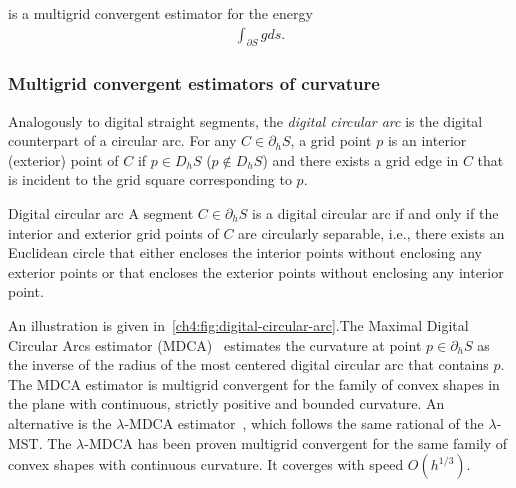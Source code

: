 is a multigrid convergent estimator for the energy~\cite{lachaud06hdr}
\begin{align*}
	\int_{\partial S}{ g ds }.
\end{align*}



\subsubsection{Multigrid convergent estimators of curvature}

Analogously to digital straight segments, the \emph{digital circular arc} is the digital counterpart of a circular arc. For any $C \in \partial_h S$, a grid point $p$ is an interior (exterior) point of $C$ if $p \in D_h S$ ($p \notin D_h S$) and there exists a grid edge in $C$ that is incident to the grid square corresponding to $p$.

\begin{definition}{Digital circular arc} 
A segment $C \in \partial_h S$ is a digital circular arc if and only if the interior and exterior grid points of $C$ are circularly separable, i.e., there exists an Euclidean circle that either encloses the interior points without enclosing any exterior points or that encloses the exterior points without enclosing any interior point.
\end{definition}

An illustration is given in~\cref{ch4:fig:digital-circular-arc}.The Maximal Digital Circular Arcs estimator (MDCA)~\cite{roussillon11mdca} estimates the curvature at point $p \in \partial_h S$ as the inverse of the radius of the most centered digital circular arc that contains $p$. The MDCA estimator is multigrid convergent for the family of convex shapes in the plane with continuous, strictly positive and bounded curvature. An alternative is the $\lambda$-MDCA estimator~\cite{schindele17mdca}, which follows the same rational of the $\lambda$-MST. The $\lambda$-MDCA has been proven multigrid convergent for the same family of convex shapes with continuous curvature. It coverges with speed $O(h^{1/3})$.


